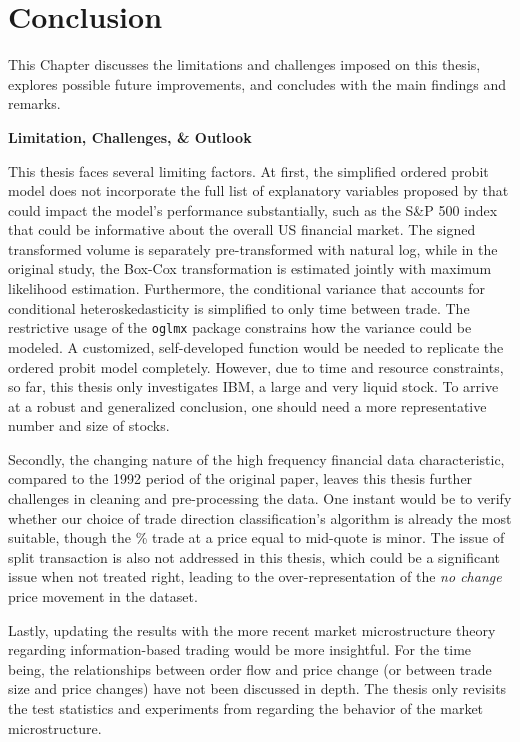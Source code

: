 \chapter{Conclusion}\label{chap:conclusion}
This Chapter discusses the limitations and challenges imposed on this thesis, explores possible future improvements, and concludes with the main findings and remarks. 

\vspace{5mm}
{\noindent\bfseries Limitation, Challenges, \& Outlook }

This thesis faces several limiting factors. At first, the simplified ordered probit model does not incorporate the full list of explanatory variables proposed by \citet{hausman1992} that could impact the model's performance substantially, such as the S\&P 500 index that could be informative about the overall US financial market. The signed transformed volume is separately pre-transformed with natural log, while in the original study, the Box-Cox transformation is estimated jointly with maximum likelihood estimation. Furthermore, the conditional variance that accounts for conditional heteroskedasticity is simplified to only time between trade. The restrictive usage of the \verb|oglmx| package constrains how the variance could be modeled. A customized, self-developed function would be needed to replicate the ordered probit model completely. However, due to time and resource constraints, so far, this thesis only investigates IBM, a large and very liquid stock. To arrive at a robust and generalized conclusion, one should need a more representative number and size of stocks. 

Secondly, the changing nature of the high frequency financial data characteristic, compared to the 1992 period of the original paper, leaves this thesis further challenges in cleaning and pre-processing the data. One instant would be to verify whether our choice of trade direction classification's algorithm is already the most suitable, though the \% trade at a price equal to mid-quote is minor. The issue of split transaction \citep{hautsch2012} is also not addressed in this thesis, which could be a significant issue when not treated right, leading to the over-representation of the \textit{no change} price movement in the dataset.

Lastly, updating the results with the more recent market microstructure theory regarding information-based trading would be more insightful. For the time being, the relationships between order flow and price change (or between trade size and price changes) have not been discussed in depth. The thesis only revisits the test statistics and experiments from \citet{hausman1992} regarding the behavior of the market microstructure.



